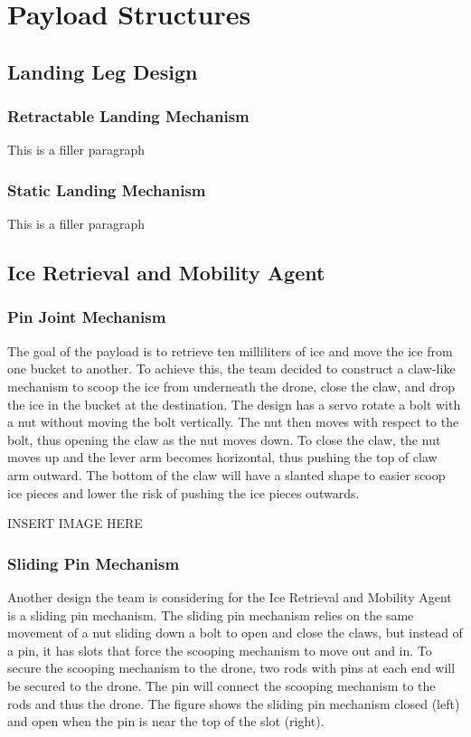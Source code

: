 \section{Payload Structures}\label{PL:Tradeoffs:Structures}
	\subsection{Landing Leg Design}
		\subsubsection{Retractable Landing Mechanism}
			This is a filler paragraph

		\subsubsection{Static Landing Mechanism}
			This is a filler paragraph

	\subsection{Ice Retrieval and Mobility Agent}
		\subsubsection{Pin Joint Mechanism}
			The goal of the payload is to retrieve ten milliliters of ice and move the ice from one bucket to another. To achieve this, the team decided to construct a claw-like mechanism to scoop the ice from underneath the drone, close the claw, and drop the ice in the bucket at the destination. The design has a servo rotate a bolt with a nut without moving the bolt vertically. The nut then moves with respect to the bolt, thus opening the claw as the nut moves down. To close the claw, the nut moves up and the lever arm becomes horizontal, thus pushing the top of claw arm outward. The bottom of the claw will have a slanted shape to easier scoop ice pieces and lower the risk of pushing the ice pieces outwards. 

			INSERT IMAGE HERE

		\subsubsection{Sliding Pin Mechanism}
			Another design the team is considering for the Ice Retrieval and Mobility Agent is a sliding pin mechanism. The sliding pin mechanism relies on the same movement of a nut sliding down a bolt to open and close the claws, but instead of a pin, it has slots that force the scooping mechanism to move out and in. To secure the scooping mechanism to the drone, two rods with pins at each end will be secured to the drone. The pin will connect the scooping mechanism to the rods and thus the drone. The figure shows the sliding pin mechanism closed (left) and open when the pin is near the top of the slot (right). 

